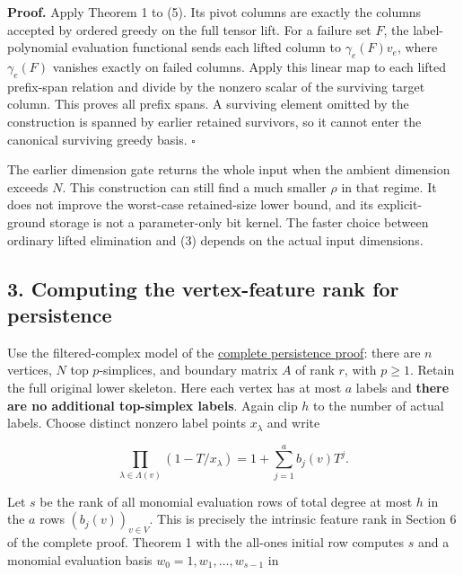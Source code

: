 \textbf{Proof.} Apply Theorem 1 to (5). Its pivot columns are exactly the columns accepted by ordered greedy on the full tensor lift. For a failure set \(F\), the label-polynomial evaluation functional sends each lifted column to \(\gamma_e(F)v_e\), where \(\gamma_e(F)\) vanishes exactly on failed columns. Apply this linear map to each lifted prefix-span relation and divide by the nonzero scalar of the surviving target column. This proves all prefix spans. A surviving element omitted by the construction is spanned by earlier retained survivors, so it cannot enter the canonical surviving greedy basis. \(\square\)

The earlier dimension gate returns the whole input when the ambient dimension exceeds \(N\). This construction can still find a much smaller \(\rho\) in that regime. It does not improve the worst-case retained-size lower bound, and its explicit-ground storage is not a parameter-only bit kernel. The faster choice between ordinary lifted elimination and (3) depends on the actual input dimensions.

\hypertarget{af-4b125c3959-computing-the-vertex-feature-rank-for-persistence}{%
\subsection{3. Computing the vertex-feature rank for persistence}\label{af-4b125c3959-computing-the-vertex-feature-rank-for-persistence}}

Use the filtered-complex model of the \href{https://github.com/icekylinx/algorithm-frontier/blob/main/problems/persistence-failure-certificates/manuscripts/correlated-fault-boundary-and-persistence-sparsifiers.md}{complete persistence proof}: there are \(n\) vertices, \(N\) top \(p\)-simplices, and boundary matrix \(A\) of rank \(r\), with \(p\ge1\). Retain the full original lower skeleton. Here each vertex has at most \(a\) labels and \textbf{there are no additional top-simplex labels}. Again clip \(h\) to the number of actual labels. Choose distinct nonzero label points \(x_\lambda\) and write

\[
\prod_{\lambda\in\Lambda(v)}(1-T/x_\lambda)
       =1+\sum_{j=1}^a b_j(v)T^j.
\tag{7}
\]

Let \(s\) be the rank of all monomial evaluation rows of total degree at most \(h\) in the \(a\) rows \((b_j(v))_{v\in V}\). This is precisely the intrinsic feature rank in Section 6 of the complete proof. Theorem 1 with the all-ones initial row computes \(s\) and a monomial evaluation basis \(w_0=1,w_1,\ldots,w_{s-1}\) in

